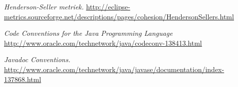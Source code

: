 \begin{thebibliography}{99}
	 \emph{Henderson-Seller metriek.} \url{http://eclipse-metrics.sourceforge.net/descriptions/pages/cohesion/HendersonSellers.html}
	
	 \emph{Code Conventions for the Java Programming Language} \url{http://www.oracle.com/technetwork/java/codeconv-138413.html}
	
	 \emph{Javadoc Conventions. } \url{http://www.oracle.com/technetwork/java/javase/documentation/index-137868.html}





\end{thebibliography}


\endgroup